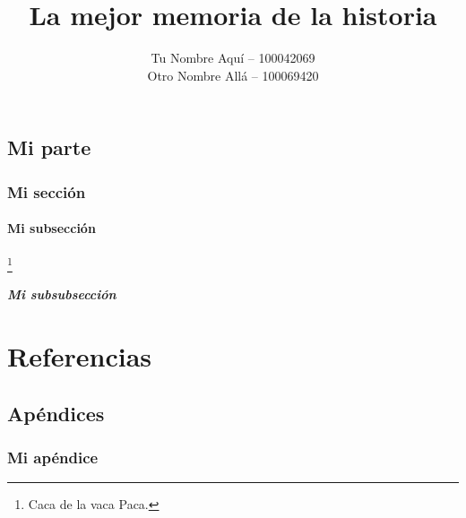 \documentclass[es]{uc3mreport}
\author{
    Tu Nombre Aquí -- 100042069\\
    Otro Nombre Allá -- 100069420
}
\title{La mejor memoria de la historia}
\begin{document}
    \makecover

    \tableofcontents

    \begin{report}
        \part{Mi parte}
        \lipsum[1] \parencite{cicero45finibus}

        \section{Mi sección}
        \lipsum[1]

        \subsection{Mi subsección}
        \lipsum[2-4]\footnote{Caca de la vaca Paca.}

        \subsubsection{Mi subsubsección}
        \lipsum[2-4]


    \end{report}


    \label{bibliography}
    \part{Referencias}
    \printbibliography

    \begin{appendices}
        \part{Apéndices}  %
        \section{Mi apéndice}
        \lipsum[1]
    \end{appendices}
\end{document}
